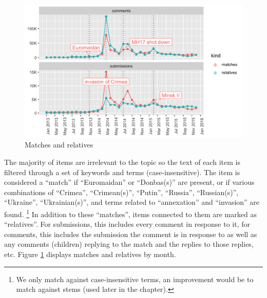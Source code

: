 \begin{figure}[!ht]
\centering
\includegraphics[width=\textwidth]{rus/things1}
\caption{Matches and relatives}
\label{fig:matches}
\end{figure}

The majority of items are irrelevant to the topic so the text of each item is filtered through a set of keywords and terms (case-insensitive).
The item is considered a ``match'' if ``Euromaidan'' or ``Donbas(s)'' are present, or if various combinations of ``Crimea'', ``Crimean(s)'', ``Putin'', ``Russia'', ``Russian(s)'', ``Ukraine'', ``Ukrainian(s)'', and terms related to ``annexation'' and ``invasion'' are found. \footnote{We only match against case-insensitive terms, an improvement would be to match against stems (used later in the chapter).}
In addition to these ``matches'', items connected to them are marked as ``relatives''.
For submissions, this includes every comment in response to it, for comments, this includes the submission the comment is in response to as well as any comments (children) replying to the match and the replies to those replies, etc.
Figure \ref{fig:matches} displays matches and relatives by month.

